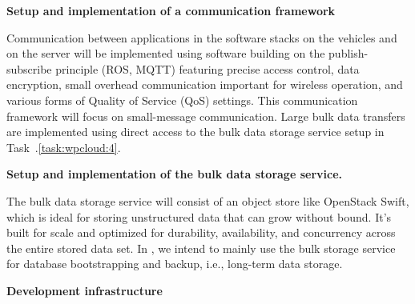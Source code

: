 {\begin{tasks}{\WPCloudNo}
\item {\bf Setup and implementation of a communication framework}
\label{task:wpcloud:3}

Communication between applications in the software stacks on the vehicles
  and on the server will be implemented using software building on the publish-subscribe principle (\eg ROS, MQTT)
 featuring precise access control, data encryption, small overhead
  communication important for wireless operation, and various forms of Quality of
  Service (QoS) settings.
This communication framework will focus on small-message communication.
Large bulk data transfers are implemented using direct access
  to the bulk data storage service setup in Task~\WPCloud.\ref{task:wpcloud:4}.


\item {\bf Setup and implementation of the bulk data storage service.}
\label{task:wpcloud:4}
\taskpartner{\IBM}

The bulk data storage service will consist of an object store like OpenStack Swift,
  which is ideal for storing unstructured data that can grow without bound.
It's built for scale and optimized for durability, availability, and concurrency
  across the entire stored data set.
In \Project,
  we intend to mainly use the bulk storage service for database bootstrapping and
  backup, i.e., long-term data storage.


%

\end{tasks}


\begin{deliverables}{\WPCloudNo}


\item {\bf Development infrastructure} 
	\delresponsible{\IBM}
	\label{del:wpcloud:1}


\end{deliverables}}
